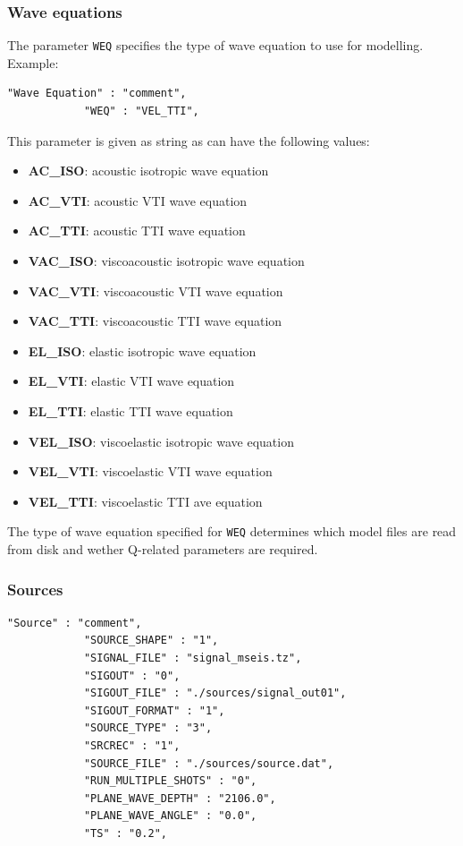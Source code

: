 \subsubsection{Wave equations}
The parameter \texttt{WEQ} specifies the type of wave equation to use for modelling. Example:
\begin{verbatim}
"Wave Equation" : "comment",
            "WEQ" : "VEL_TTI",
\end{verbatim}
This parameter is given as string as can have the following values:
\begin{itemize}
\item \textbf{AC\_ISO}: acoustic isotropic wave equation
\item \textbf{AC\_VTI}: acoustic VTI wave equation
\item \textbf{AC\_TTI}: acoustic TTI wave equation
\item \textbf{VAC\_ISO}: viscoacoustic isotropic wave equation
\item \textbf{VAC\_VTI}: viscoacoustic VTI wave equation
\item \textbf{VAC\_TTI}: viscoacoustic TTI wave equation
\item \textbf{EL\_ISO}: elastic isotropic wave equation
\item \textbf{EL\_VTI}: elastic VTI wave equation
\item \textbf{EL\_TTI}: elastic TTI wave equation
\item \textbf{VEL\_ISO}: viscoelastic isotropic wave equation
\item \textbf{VEL\_VTI}: viscoelastic VTI wave equation
\item \textbf{VEL\_TTI}: viscoelastic TTI ave equation
\end{itemize}
The type of wave equation specified for \texttt{WEQ} determines which model files are read from disk and wether Q-related parameters are required.

\subsubsection{Sources}
\label{sources}
\begin{verbatim}
"Source" : "comment",
            "SOURCE_SHAPE" : "1",
            "SIGNAL_FILE" : "signal_mseis.tz",
            "SIGOUT" : "0",
            "SIGOUT_FILE" : "./sources/signal_out01",
            "SIGOUT_FORMAT" : "1",
            "SOURCE_TYPE" : "3",
            "SRCREC" : "1",
            "SOURCE_FILE" : "./sources/source.dat",
            "RUN_MULTIPLE_SHOTS" : "0",
            "PLANE_WAVE_DEPTH" : "2106.0",
            "PLANE_WAVE_ANGLE" : "0.0",
            "TS" : "0.2",
\end{verbatim}

